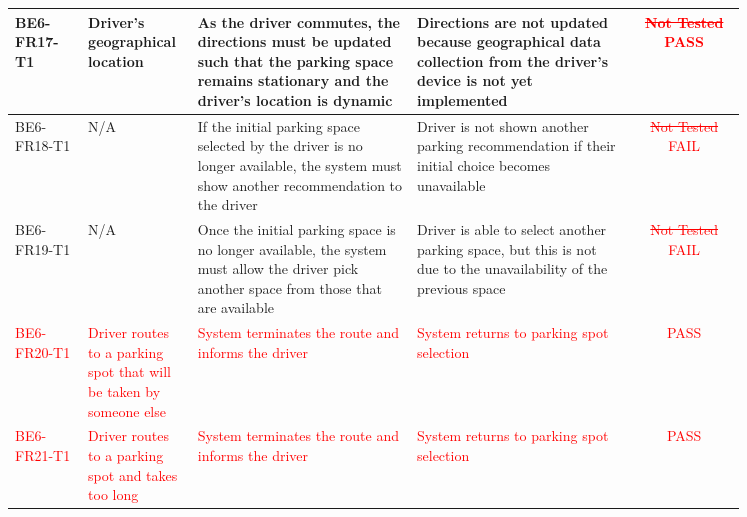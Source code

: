 \documentclass[12pt, titlepage]{article}
\begin{document}
\begin{center}
\begin{tabular}{|p{0.10\linewidth}|p{0.15\linewidth}|p{0.30\linewidth}|p{0.30\linewidth}|c|} 
\hline
BE6-FR17-T1 & Driver’s geographical location & As the driver commutes, the
directions must be updated such that the parking space remains stationary and
the driver’s location is dynamic & Directions are not updated because
geographical data collection from the driver's device is not yet implemented &
\textcolor{red}{\st{Not Tested} PASS} \\ 
\hline
BE6-FR18-T1 & N/A & If the initial parking space selected by the driver is no
longer available, the system must show another recommendation to the driver &
Driver is not shown another parking recommendation if their initial choice
becomes unavailable & \textcolor{red}{\st{Not Tested} FAIL} \\ 
\hline
BE6-FR19-T1 & N/A & Once the initial parking space is no longer available, the
system must allow the driver pick another space from those that are available &
Driver is able to select another parking space, but this is not due to the
unavailability of the previous space & \textcolor{red}{\st{Not Tested} FAIL} \\ 
\hline
\textcolor{red}{BE6-FR20-T1} & \textcolor{red}{Driver routes to a parking spot
that will be taken by someone else} & \textcolor{red}{System terminates the
route and informs the driver} & \textcolor{red}{System returns to parking spot
selection}  & \textcolor{red}{PASS} \\ 
\hline
\textcolor{red}{BE6-FR21-T1} & \textcolor{red}{Driver routes to a parking spot
and takes too long} & \textcolor{red}{System terminates the route and informs
the driver} & \textcolor{red}{System returns to parking spot selection}  &
\textcolor{red}{PASS} \\ 
\hline
\end{tabular}
\end{center}
\end{document}

